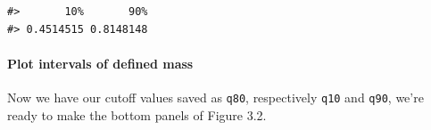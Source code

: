 \documentclass[
  letterpaper,
  DIV=11,
  numbers=noendperiod]{scrreprt}
\let\oldparagraph\paragraph
\renewcommand{\paragraph}[1]{\oldparagraph{#1}\mbox{}}
\newenvironment{Shaded}{\begin{snugshade}}{\end{snugshade}}
\newcommand{\AttributeTok}[1]{\textcolor[rgb]{0.40,0.45,0.13}{#1}}
\newcommand{\CommentTok}[1]{\textcolor[rgb]{0.37,0.37,0.37}{#1}}
\newcommand{\DecValTok}[1]{\textcolor[rgb]{0.68,0.00,0.00}{#1}}
\newcommand{\FunctionTok}[1]{\textcolor[rgb]{0.28,0.35,0.67}{#1}}
\newcommand{\InformationTok}[1]{\textcolor[rgb]{0.37,0.37,0.37}{#1}}
\newcommand{\NormalTok}[1]{\textcolor[rgb]{0.00,0.23,0.31}{#1}}
\newcommand{\SpecialCharTok}[1]{\textcolor[rgb]{0.37,0.37,0.37}{#1}}
\begin{document}
\begin{Shaded}
\end{Shaded}

\begin{verbatim}
#>       10%       90% 
#> 0.4514515 0.8148148
\end{verbatim}

\hypertarget{plot-intervals-of-defined-mass}{%
\paragraph{Plot intervals of defined
mass}\label{plot-intervals-of-defined-mass}}

Now we have our cutoff values saved as \texttt{q80}, respectively
\texttt{q10} and \texttt{q90}, we're ready to make the bottom panels of
Figure 3.2.
\end{document}
